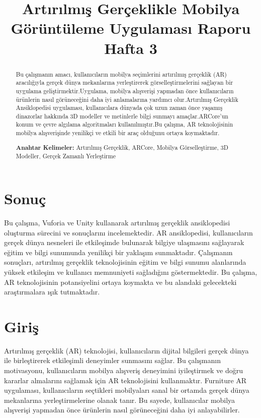\documentclass[12pt, a4paper]{article}
\begin{document}
	\section{Sonuç}
	Bu çalışma, Vuforia ve Unity kullanarak artırılmış gerçeklik ansiklopedisi oluşturma sürecini ve sonuçlarını incelemektedir. AR ansiklopedisi, kullanıcıların gerçek dünya nesneleri ile etkileşimde bulunarak bilgiye ulaşmasını sağlayarak eğitim ve bilgi sunumunda yenilikçi bir yaklaşım sunmaktadır. Çalışmanın sonuçları, artırılmış gerçeklik teknolojisinin eğitim ve bilgi sunumu alanlarında yüksek etkileşim ve kullanıcı memnuniyeti sağladığını göstermektedir. Bu çalışma, AR teknolojisinin potansiyelini ortaya koymakta ve bu alandaki gelecekteki araştırmalara ışık tutmaktadır.
	\setcounter{section}{0}
	\newpage
		\title{Artırılmış Gerçeklikle Mobilya Görüntüleme Uygulaması Raporu Hafta 3}
	\author{}
	\date{}
	\maketitle
		\begin{abstract}
		\begin{justify}
		Bu çalışmanın amacı, kullanıcıların mobilya seçimlerini artırılmış gerçeklik (AR) aracılığıyla gerçek dünya mekanlarına yerleştirerek \newline görselleştirmelerini sağlayan bir uygulama geliştirmektir.Uygulama, mobilya alışverişi yapmadan önce kullanıcıların ürünlerin nasıl görüneceğini daha iyi anlamalarına yardımcı olur.Artırılmış Gerçeklik Ansiklopedisi uygulaması, kullanıcılara dünyada çok uzun zaman önce yaşamış  dinazorlar hakkında 3D modeller ve metinlerle bilgi sunmayı amaçlar.ARCore’un konum ve çevre algılama algoritmaları kullanılmıştır.Bu çalışma, AR teknolojisinin mobilya alışverişinde yenilikçi ve etkili bir araç olduğunu ortaya koymaktadır.  
		\end{justify}
		\textbf{Anahtar Kelimeler:}  Artırılmış Gerçeklik, ARCore, Mobilya \newline Görselleştirme, 3D Modeller, Gerçek Zamanlı Yerleştirme
		
	\end{abstract}
	\section{Giriş}
	Artırılmış gerçeklik (AR) teknolojisi, kullanıcıların dijital bilgileri gerçek dünya ile birleştirerek etkileşimli deneyimler sunmasını sağlar. Bu çalışmanın motivasyonu, kullanıcıların mobilya alışveriş deneyimini iyileştirmek ve doğru kararlar almalarını sağlamak için AR teknolojisini kullanmaktır. Furniture AR uygulaması, kullanıcıların seçtikleri mobilyaları sanal bir ortamda gerçek dünya mekanlarına yerleştirmelerine olanak tanır. Bu sayede, kullanıcılar mobilya alışverişi yapmadan önce ürünlerin nasıl görüneceğini daha iyi anlayabilirler.
\end{document}
